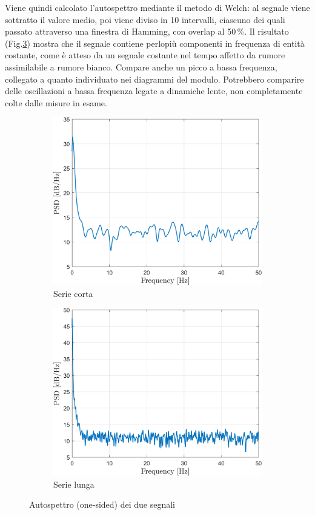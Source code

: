 Viene quindi calcolato l'autospettro mediante il metodo di Welch: al segnale viene sottratto il valore medio, poi viene diviso in 10 intervalli, ciascuno dei quali passato attraverso una finestra di Hamming, con overlap al 50\,\%. Il risultato (Fig.\ref{fig:freqboth}) mostra che il segnale contiene perlopiù componenti in frequenza di entità costante, come è atteso da un segnale costante nel tempo affetto da rumore assimilabile a rumore bianco. Compare anche un picco a bassa frequenza, collegato a quanto individuato nei diagrammi del modulo.
Potrebbero comparire delle oscillazioni a bassa frequenza legate a dinamiche lente, non completamente colte dalle misure in esame. 
\begin{figure}[H]
	\centering
	\begin{subfigure}{0.5\textwidth}
		\centering
	\includegraphics[width=0.95\linewidth]{"../sperimentazione nei propulsori/freq_short"}
	\caption{Serie corta}
	\label{fig:freqshort}
	\end{subfigure}%
	\begin{subfigure}{0.5\textwidth}
	\centering
\includegraphics[width=0.95\linewidth]{"../sperimentazione nei propulsori/freq_long"}
\caption{Serie lunga}
\label{fig:freqlong}
	\end{subfigure}
	\caption{Autospettro (one-sided) dei due segnali}
	\label{fig:freqboth}
\end{figure}
